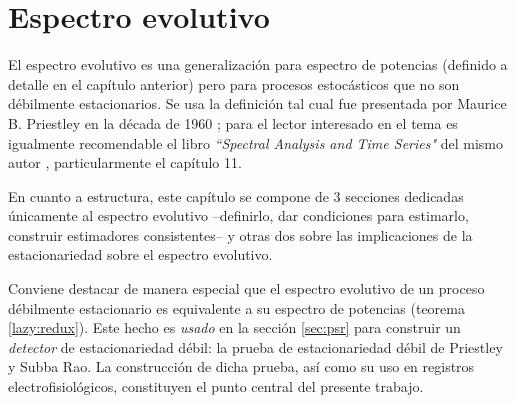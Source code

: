 \documentclass[12pt,letterpaper]{book}
\begin{document}
\chapter{Espectro evolutivo}
\label{capitulo:espectro_evo}

El espectro evolutivo es una generalización para espectro de potencias (definido a detalle en el capítulo anterior) pero para procesos estocásticos que no son débilmente estacionarios.
%
Se usa la definición tal cual fue presentada por Maurice B. Priestley en la década de 1960 \cite{Priestley65,Priestley66,Priestley69};
%
para el lector interesado en el tema es igualmente recomendable el libro \textit{``Spectral Analysis and Time Series"} del mismo autor \cite{Priestley81}, particularmente el capítulo 11.

En cuanto a estructura, este capítulo se compone de 3 secciones dedicadas únicamente al espectro evolutivo --definirlo, dar condiciones para estimarlo, construir estimadores consistentes-- y otras dos sobre las implicaciones de la estacionariedad sobre el espectro evolutivo.

Conviene destacar de manera especial que el espectro evolutivo de un proceso débilmente estacionario es equivalente a su espectro de potencias (teorema \ref{lazy:redux}). Este hecho es \textit{usado} en la sección \ref{sec:psr} para construir un \textit{detector} de estacionariedad débil: la prueba de estacionariedad débil de Priestley y Subba Rao.
%
La construcción de dicha prueba, así como su uso en registros electrofisiológicos, constituyen el punto central del presente trabajo.

%

\end{document}
